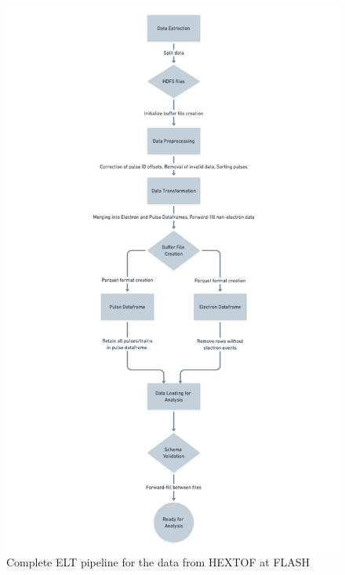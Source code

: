 




\begin{figure}
    \label{fig:elt}
    \centering
    \includegraphics[width=1\linewidth]{images/elt_cropped.png}
    \caption{Complete \gls{ELT} pipeline for the data from \gls{HEXTOF} at \gls{FLASH}}
\end{figure}